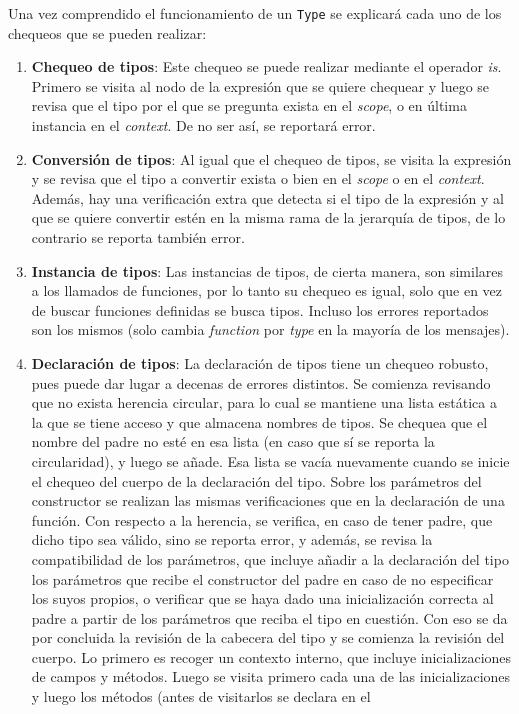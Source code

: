 \documentclass{llncs}
\begin{document}
Una vez comprendido el funcionamiento de un \texttt{Type} se explicará cada uno de los chequeos que se pueden realizar:
\begin{enumerate}
    \item \textbf{Chequeo de tipos}: Este chequeo se puede realizar mediante el operador \textit{is}. Primero se visita al nodo de la expresión que se quiere chequear y luego se revisa que el tipo por el que se pregunta exista en el \textit{scope}, o en última 
    instancia en el \textit{context}. De no ser así, se reportará error.
    \item \textbf{Conversión de tipos}: Al igual que el chequeo de tipos, se visita la expresión y se revisa que el tipo a convertir exista o bien en el \textit{scope} o en el \textit{context}. Además, hay una verificación extra que detecta si el tipo de 
    la expresión y al que se quiere convertir estén en la misma rama de la jerarquía de tipos, de lo contrario se reporta también error.
    \item \textbf{Instancia de tipos}: Las instancias de tipos, de cierta manera, son similares a los llamados de funciones, por lo tanto su chequeo es igual, solo que en vez de buscar funciones definidas se busca tipos. Incluso los errores reportados son 
    los mismos (solo cambia \textit{function} por \textit{type} en la mayoría de los mensajes).
    \item \textbf{Declaración de tipos}: La declaración de tipos tiene un chequeo robusto, pues puede dar lugar a decenas de errores distintos. Se comienza revisando que no exista herencia circular, para lo cual se mantiene una lista estática a la que se tiene acceso y 
    que almacena nombres de tipos. Se chequea que el nombre del padre no esté en esa lista (en caso que sí se reporta la circularidad), y luego se añade. Esa lista se vacía nuevamente cuando se inicie el chequeo del cuerpo de la declaración del tipo. Sobre los parámetros del 
    constructor se realizan las mismas verificaciones que en la declaración de una función. Con respecto a la herencia, se verifica, en caso de tener padre, que dicho tipo sea válido, sino se reporta error, y además, se revisa la compatibilidad de los parámetros, que incluye 
    añadir a la declaración del tipo los parámetros que recibe el constructor del padre en caso de no especificar los suyos propios, o verificar que se haya dado una inicialización correcta al padre a partir de los parámetros que reciba el tipo en cuestión. Con eso se da por concluida 
    la revisión de la cabecera del tipo y se comienza la revisión del cuerpo. Lo primero es recoger un contexto interno, que incluye inicializaciones de campos y métodos. Luego se visita primero cada una de las inicializaciones y luego los métodos (antes de visitarlos se declara en el

\end{enumerate}
\end{document}
